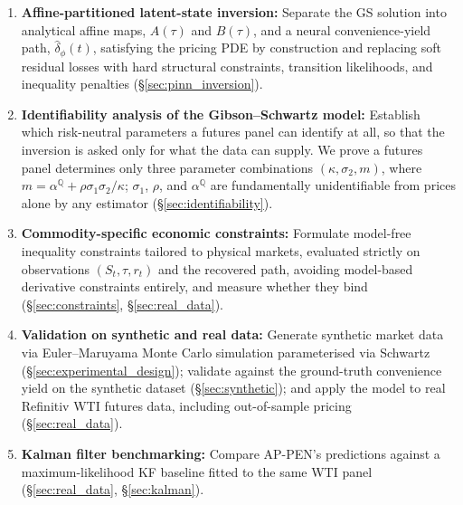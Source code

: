 \documentclass[sigconf, authorversion=true, nonacm=true]{acmart}
\begin{document}
\begin{enumerate}[noitemsep]
    \item \textbf{Affine-partitioned latent-state inversion:} Separate the GS solution into analytical affine maps, $A(\tau)$ and $B(\tau)$, and a neural convenience-yield path, $\hat{\delta}_\phi(t)$, satisfying the pricing PDE by construction and replacing soft residual losses with hard structural constraints, transition likelihoods, and inequality penalties (\S\ref{sec:pinn_inversion}).
    \item \textbf{Identifiability analysis of the Gibson--Schwartz model:} Establish which risk-neutral parameters a futures panel can identify at all, so that the inversion is asked only for what the data can supply. We prove a futures panel determines only three parameter combinations $(\kappa, \sigma_2, m)$, where $m = \alpha^{\mathbb{Q}} + \rho\sigma_1\sigma_2/\kappa$; $\sigma_1$, $\rho$, and $\alpha^{\mathbb{Q}}$ are fundamentally unidentifiable from prices alone by any estimator (\S\ref{sec:identifiability}).
    \item \textbf{Commodity-specific economic constraints:} Formulate model-free inequality constraints tailored to physical markets, evaluated strictly on observations $(S_t, \tau, r_t)$ and the recovered path, avoiding model-based derivative constraints entirely, and measure whether they bind (\S\ref{sec:constraints}, \S\ref{sec:real_data}).
    \item \textbf{Validation on synthetic and real data:} Generate synthetic market data via Euler--Maruyama Monte Carlo simulation parameterised via Schwartz~\cite{Schwartz1997TheHedging} (\S\ref{sec:experimental_design}); validate against the ground-truth convenience yield on the synthetic dataset (\S\ref{sec:synthetic}); and apply the model to real Refinitiv WTI futures data, including out-of-sample pricing (\S\ref{sec:real_data}).
    \item \textbf{Kalman filter benchmarking:} Compare AP-PEN's predictions against a maximum-likelihood KF baseline fitted to the same WTI panel (\S\ref{sec:real_data}, \S\ref{sec:kalman}).
\end{enumerate}


\end{document}
